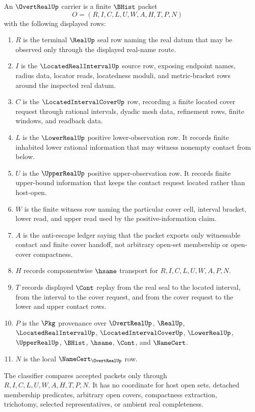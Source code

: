 \begin{definition}
\label{def:overt-real-carrier}
An $\OvertRealUp$ carrier is a finite $\BHist$ packet
$$
O=(R,I,C,L,U,W,A,H,T,P,N)
$$
with the following displayed rows:
\begin{enumerate}
\item $R$ is the terminal $\RealUp$ seal row naming the real datum that may be observed only through the displayed real-name route.
\item $I$ is the $\LocatedRealIntervalUp$ source row, exposing endpoint names, radius data, locator reads, locatedness moduli, and metric-bracket rows around the inspected real datum.
\item $C$ is the $\LocatedIntervalCoverUp$ row, recording a finite located cover request through rational intervals, dyadic mesh data, refinement rows, finite windows, and readback data.
\item $L$ is the $\LowerRealUp$ positive lower-observation row. It records finite inhabited lower rational information that may witness nonempty contact from below.
\item $U$ is the $\UpperRealUp$ positive upper-observation row. It records finite upper-bound information that keeps the contact request located rather than host-open.
\item $W$ is the finite witness row naming the particular cover cell, interval bracket, lower read, and upper read used by the positive-information claim.
\item $A$ is the anti-escape ledger saying that the packet exports only witnessable contact and finite cover handoff, not arbitrary open-set membership or open-cover compactness.
\item $H$ records componentwise $\hsame$ transport for $R,I,C,L,U,W,A,P,N$.
\item $T$ records displayed $\Cont$ replay from the real seal to the located interval, from the interval to the cover request, and from the cover request to the lower and upper contact rows.
\item $P$ is the $\Pkg$ provenance over $\OvertRealUp$, $\RealUp$, $\LocatedRealIntervalUp$, $\LocatedIntervalCoverUp$, $\LowerRealUp$, $\UpperRealUp$, $\BHist$, $\hsame$, $\Cont$, and $\NameCert$.
\item $N$ is the local $\NameCert_{\OvertRealUp}$ row.
\end{enumerate}
The classifier compares accepted packets only through $R,I,C,L,U,W,A,H,T,P,N$. It has no coordinate for host open sets, detached membership predicates, arbitrary open covers, compactness extraction, trichotomy, selected representatives, or ambient real completeness.
\end{definition}

